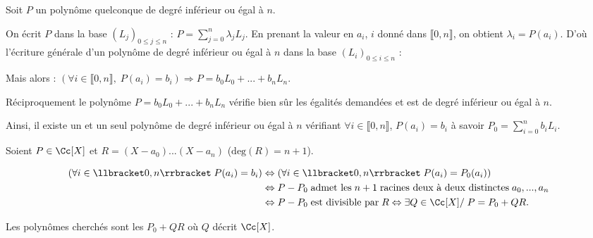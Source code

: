 {{Soit $P$ un polynôme quelconque de degré inférieur ou égal à $n$.

On écrit $P$ dans la base $(L_j)_{0\leqslant j\leqslant n}$ : $P=\sum_{j=0}^{n}\lambda_jL_j$. 
En prenant la valeur en $a_i$, $i$ donné dans $\llbracket0,n\rrbracket$, on obtient $\lambda_i= P(a_i)$. D'où l'écriture générale d'un polynôme de degré inférieur ou égal à $n$ dans la base $(L_i)_{0\leqslant i\leqslant n}$ : 

\begin{center}
\end{center}

Mais alors : $(\forall i\in\llbracket0,n\rrbracket,\;P(a_i)=b_i)\Rightarrow P=b_0L_0 + ... + b_nL_n$.

 
Réciproquement le polynôme $P= b_0L_0+ ... +b_nL_n$ vérifie bien sûr les égalités demandées et est de degré inférieur ou égal à $n$.

Ainsi, il existe un et un seul polynôme de degré inférieur ou égal à $n$ vérifiant $\forall i\in\llbracket0,n\rrbracket$, $P(a_i)=b_i$ à savoir $P_0=\sum_{i=0}^{n}b_iL_i$.

Soient $P\in\Cc[X]$ et $R=(X-a_0) ... (X-a_n)$ ($\text{deg}(R)=n+1$).

\begin{align*}\ensuremath
(\forall i\in\llbracket0,n\rrbracket\;P(a_i) = b_i)&\Leftrightarrow(\forall i\in\llbracket0,n\rrbracket\;P(a_i)=P_0(a_i))\\
 &\Leftrightarrow P-P_0\;\text{admet les}\;n+1\;\text{racines deux à deux distinctes}\;a_0,...,a_n\\
  &\Leftrightarrow P-P_0\;\text{est divisible par}\;R\Leftrightarrow\exists Q\in\Cc[X]/\;P= P_0+QR.
\end{align*}

Les polynômes cherchés sont les $P_0+QR$ où $Q$ décrit $\Cc[X]$.
}
}
